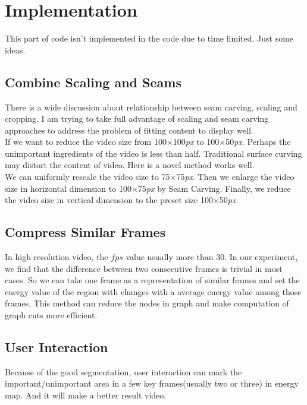 \documentclass[a4paper, twocolumn]{article}
\begin{document}
	\section{Implementation}
		
		This part of code isn't implemented in the code due to time limited. Just some ideas.
		
		\subsection{Combine Scaling and Seams}
		There is a wide discussion about relationship between seam carving, scaling and cropping. I am trying to take full advantage of scaling and seam carving approaches to address the problem of fitting content to display well.\\
		\linebreak
		If we want to reduce the video size from 100$\times$100\textit{px} to 100$\times$50\textit{px}. Perhaps the unimportant ingredients of the video is less than half. Traditional surface curving may distort the content of video. Here is a novel method works well.\\
		\linebreak
		We can uniformly rescale the video size to 75$\times$75\textit{px}. Then we enlarge the video size in horizontal dimension to 100$\times$75\textit{px} by Seam Carving. Finally, we reduce the video size in vertical dimension to the preset size 100$\times$50\textit{px}.
		
		\subsection{Compress Similar Frames}
		In high resolution video, the $fps$ value usually more than 30. In our experiment, we find that the difference between two consecutive frames is trivial in most cases. So we can take one frame as a representation of similar frames and set the energy value of the region with changes with a average energy value among those frames. This method can reduce the nodes in graph and make computation of graph cuts more efficient.
		
		\subsection{User Interaction}
		Because of the good segmentation, user interaction can mark the important/unimportant area in a few key frames(usually two or three) in energy map. And it will make a better result video.
		
\end{document}
